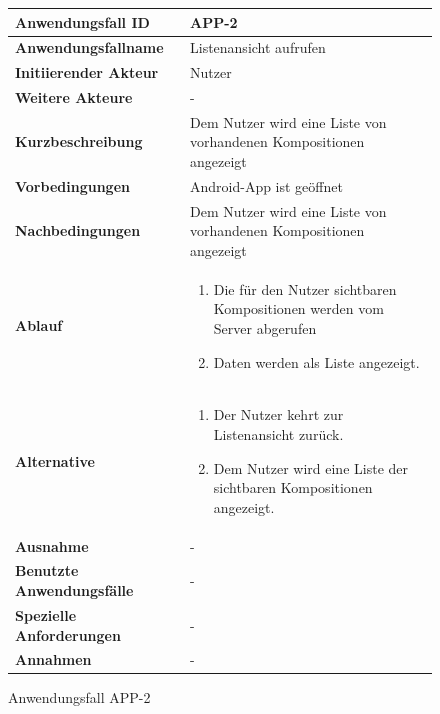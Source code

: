 \begin{figure}[h]
	\centering
	\begin{tabularx}{\textwidth}{ X | X }
		\textbf{Anwendungsfall ID} & APP-2 \\ \hline
		\textbf{Anwendungsfallname} & Listenansicht aufrufen \\ \hline
		\textbf{Initiierender Akteur} & Nutzer \\ \hline
		\textbf{Weitere Akteure} & -  \\ \hline
		\textbf{Kurzbeschreibung} & Dem Nutzer wird eine Liste von vorhandenen Kompositionen angezeigt \\ \hline
		\textbf{Vorbedingungen} & Android-App ist geöffnet  \\ \hline
		\textbf{Nachbedingungen} & Dem Nutzer wird eine Liste von vorhandenen Kompositionen angezeigt  \\ \hline
		\textbf{Ablauf} &
		\begin{enumerate}
			\item Die für den Nutzer sichtbaren Kompositionen werden vom Server abgerufen
			\item Daten werden als Liste angezeigt.
		\end{enumerate} \\ \hline
		\textbf{Alternative} &
		\begin{enumerate}
			\item Der Nutzer kehrt zur Listenansicht zurück.
			\item Dem Nutzer wird eine Liste der sichtbaren Kompositionen angezeigt.
		\end{enumerate}  \\ \hline
		\textbf{Ausnahme} &
		-  \\ \hline
		\textbf{Benutzte Anwendungsfälle} & - \\ \hline
		\textbf{Spezielle Anforderungen} & - \\ \hline
		\textbf{Annahmen} & -
	\end{tabularx}
	\caption{Anwendungsfall APP-2}
	\label{fig:anwendungsfall-app-tabelle-APP-2}
\end{figure}

\newpage

